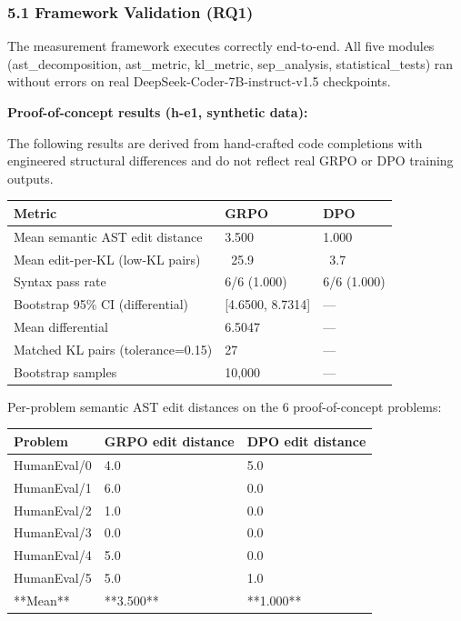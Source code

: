 
\subsubsection{5.1 Framework Validation (RQ1)}

The measurement framework executes correctly end-to-end. All five modules (ast_decomposition, ast_metric, kl_metric, sep_analysis, statistical_tests) ran without errors on real DeepSeek-Coder-7B-instruct-v1.5 checkpoints.

\textbf{Proof-of-concept results (h-e1, synthetic data):}

The following results are derived from hand-crafted code completions with engineered structural differences and do not reflect real GRPO or DPO training outputs.

\begin{table}[htbp]
\centering
\begin{tabular}{lll}
\toprule
Metric & GRPO & DPO \\
\midrule
Mean semantic AST edit distance & 3.500 & 1.000 \\
Mean edit-per-KL (low-KL pairs) & ~25.9 & ~3.7 \\
Syntax pass rate & 6/6 (1.000) & 6/6 (1.000) \\
Bootstrap 95\% CI (differential) & [4.6500, 8.7314] & — \\
Mean differential & 6.5047 & — \\
Matched KL pairs (tolerance=0.15) & 27 & — \\
Bootstrap samples & 10,000 & — \\
\bottomrule
\end{tabular}
\end{table}

Per-problem semantic AST edit distances on the 6 proof-of-concept problems:

\begin{table}[htbp]
\centering
\begin{tabular}{lll}
\toprule
Problem & GRPO edit distance & DPO edit distance \\
\midrule
HumanEval/0 & 4.0 & 5.0 \\
HumanEval/1 & 6.0 & 0.0 \\
HumanEval/2 & 1.0 & 0.0 \\
HumanEval/3 & 0.0 & 0.0 \\
HumanEval/4 & 5.0 & 0.0 \\
HumanEval/5 & 5.0 & 1.0 \\
**Mean** & **3.500** & **1.000** \\
\bottomrule
\end{tabular}
\end{table}

